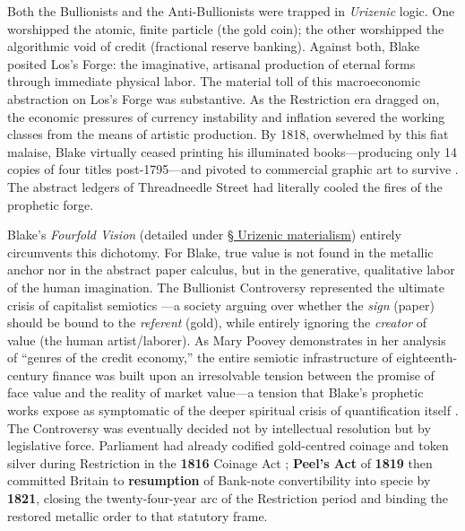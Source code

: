 \documentclass[
]{article}
\begin{document}
Both the Bullionists and the Anti-Bullionists were trapped in
\emph{Urizenic} logic. One worshipped the atomic, finite particle (the
gold coin); the other worshipped the algorithmic void of credit
(fractional reserve banking). Against both, Blake posited Los's Forge:
the imaginative, artisanal production of eternal forms through immediate
physical labor. The material toll of this macroeconomic abstraction on
Los's Forge was substantive. As the Restriction era dragged on, the
economic pressures of currency instability and inflation severed the
working classes from the means of artistic production. By 1818,
overwhelmed by this fiat malaise, Blake virtually ceased printing his
illuminated books---producing only 14 copies of four titles
post-1795---and pivoted to commercial graphic art to survive
\citep{makdisi2003william}. The abstract ledgers of Threadneedle Street
had literally cooled the fires of the prophetic forge.

Blake's \emph{Fourfold Vision} (detailed under
\hyperref[sec-urizenic-materialism]{§ Urizenic materialism}) entirely
circumvents this dichotomy. For Blake, true value is not found in the
metallic anchor nor in the abstract paper calculus, but in the
generative, qualitative labor of the human imagination. The Bullionist
Controversy represented the ultimate crisis of capitalist semiotics
\citep{fetter1965development}---a society arguing over whether the
\emph{sign} (paper) should be bound to the \emph{referent} (gold), while
entirely ignoring the \emph{creator} of value (the human
artist/laborer). As Mary Poovey demonstrates in her analysis of ``genres
of the credit economy,'' the entire semiotic infrastructure of
eighteenth-century finance was built upon an irresolvable tension
between the promise of face value and the reality of market value---a
tension that Blake's prophetic works expose as symptomatic of the deeper
spiritual crisis of quantification itself \citep{poovey2008genres}. The
Controversy was eventually decided not by intellectual resolution but by
legislative force. Parliament had already codified gold-centred coinage
and token silver during Restriction in the \textbf{1816} Coinage Act
\citep{redish1990evolution}; \textbf{Peel's Act} of \textbf{1819} then
committed Britain to \textbf{resumption} of Bank-note convertibility
into specie by \textbf{1821}, closing the twenty-four-year arc of the
Restriction period \citep{fetter1965development} and binding the
restored metallic order to that statutory frame.

\newpage
\end{document}
